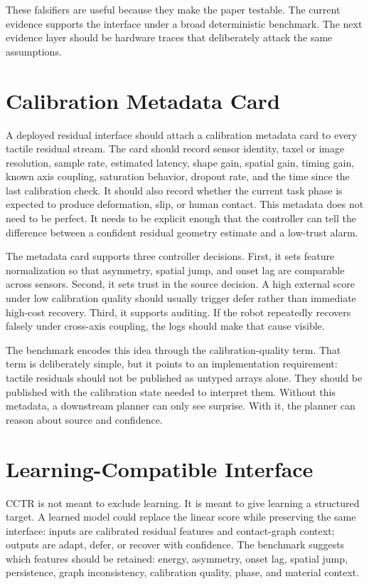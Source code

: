 \documentclass{article}
\newcommand{\method}{CCTR}
\begin{document}
These falsifiers are useful because they make the paper testable. The current evidence supports the interface under a broad deterministic benchmark. The next evidence layer should be hardware traces that deliberately attack the same assumptions.

\section{Calibration Metadata Card}

A deployed residual interface should attach a calibration metadata card to every tactile residual stream. The card should record sensor identity, taxel or image resolution, sample rate, estimated latency, shape gain, spatial gain, timing gain, known axis coupling, saturation behavior, dropout rate, and the time since the last calibration check. It should also record whether the current task phase is expected to produce deformation, slip, or human contact. This metadata does not need to be perfect. It needs to be explicit enough that the controller can tell the difference between a confident residual geometry estimate and a low-trust alarm.

The metadata card supports three controller decisions. First, it sets feature normalization so that asymmetry, spatial jump, and onset lag are comparable across sensors. Second, it sets trust in the source decision. A high external score under low calibration quality should usually trigger defer rather than immediate high-cost recovery. Third, it supports auditing. If the robot repeatedly recovers falsely under cross-axis coupling, the logs should make that cause visible.

The benchmark encodes this idea through the calibration-quality term. That term is deliberately simple, but it points to an implementation requirement: tactile residuals should not be published as untyped arrays alone. They should be published with the calibration state needed to interpret them. Without this metadata, a downstream planner can only see surprise. With it, the planner can reason about source and confidence.

\section{Learning-Compatible Interface}

\method{} is not meant to exclude learning. It is meant to give learning a structured target. A learned model could replace the linear score while preserving the same interface: inputs are calibrated residual features and contact-graph context; outputs are adapt, defer, or recover with confidence. The benchmark suggests which features should be retained: energy, asymmetry, onset lag, spatial jump, persistence, graph inconsistency, calibration quality, phase, and material context.
\end{document}
